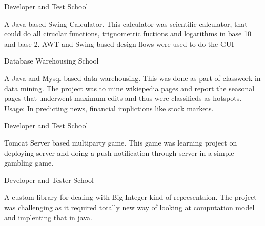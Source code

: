 
\begin{cventries}

  \cventry
    {Developer and Test} %
    {} %
    {School} %
    {} %
    {
      \begin{cvitems} %
        \item {A Java based Swing Calculator. This calculator was scientific calculator, that could do all ciruclar functions, trignometric fuctions and logarithms in base 10 and base 2. AWT and Swing based design flows were used to do the GUI}
      \end{cvitems}
    }

  \cventry
    {Database Warehousing} %
    {} %
    {School} %
    {} %
    {
      \begin{cvitems} %
        \item {A Java and Mysql based data warehousing. This was done as part of classwork in data mining. The project was to mine wikiepedia pages and report the seasonal pages that underwent maximum edits and thus were classifieds as hotspots. Usage: In predicting news, financial implictions like stock markets.}
      \end{cvitems}
    }
  \cventry
    {Developer and Test} %
    {} %
    {School} %
    {} %
    {
      \begin{cvitems} %
        \item {Tomcat Server based multiparty game. This game was learning project on deploying server and doing a push notification through server in a simple gambling game.}
      \end{cvitems}
    }
  \cventry
    {Developer and Tester} %
    {} %
    {School} %
    {} %
    {
      \begin{cvitems} %
        \item {A custom library for dealing with Big Integer kind of representaion. The project was challenging as it required totally new way of looking at computation model and implenting  that in java.}
      \end{cvitems}
    }


\end{cventries}
